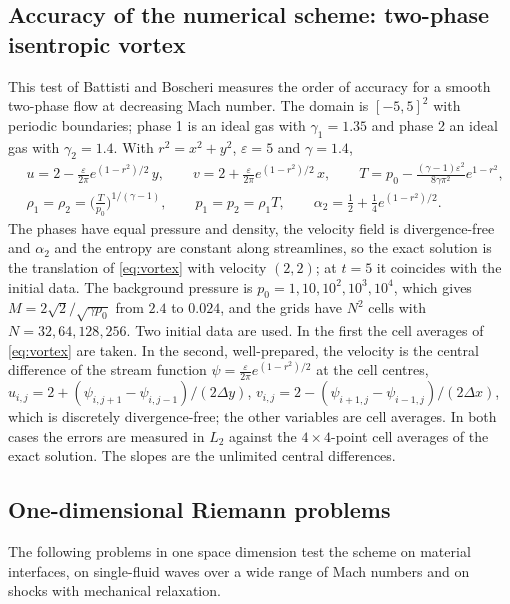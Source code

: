 \subsection{Accuracy of the numerical scheme: two-phase isentropic vortex}
\label{sec:res_vortex}
This test of Battisti and Boscheri \cite[Sec.~4.1]{BattistiBoscheri2025} measures the order of accuracy for a smooth two-phase flow at decreasing
Mach number. The domain is $[-5,5]^2$ with periodic boundaries; phase 1 is an ideal gas with $\gamma_1=1.35$ and
phase 2 an ideal gas with $\gamma_2=1.4$. With $r^2=x^2+y^2$, $\varepsilon=5$ and $\gamma=1.4$,
\begin{equation}
\begin{aligned}
&u=2-\frac{\varepsilon}{2\pi}e^{(1-r^2)/2}\,y,\qquad v=2+\frac{\varepsilon}{2\pi}e^{(1-r^2)/2}\,x,\qquad
T=p_0-\frac{(\gamma-1)\varepsilon^2}{8\gamma\pi^2}e^{1-r^2},\\
&\rho_1=\rho_2=\Big(\frac{T}{p_0}\Big)^{1/(\gamma-1)},\qquad p_1=p_2=\rho_1T,\qquad \alpha_2=\frac12+\frac14e^{(1-r^2)/2}.
\end{aligned}
\label{eq:vortex}
\end{equation}
The phases have equal pressure and density, the velocity field is divergence-free and $\alpha_2$ and the entropy are
constant along streamlines, so the exact solution is the translation of \eqref{eq:vortex} with velocity $(2,2)$; at
$t=5$ it coincides with the initial data. The background pressure is $p_0=1,10,10^2,10^3,10^4$, which gives
$M=2\sqrt2/\sqrt{\gamma p_0}$ from $2.4$ to $0.024$, and the grids have $N^2$ cells with $N=32,64,128,256$. Two initial
data are used. In the first the cell averages of \eqref{eq:vortex} are taken. In the second, well-prepared, the
velocity is the central difference of the stream function $\psi=\frac{\varepsilon}{2\pi}e^{(1-r^2)/2}$ at the cell
centres, $u_{i,j}=2+(\psi_{i,j+1}-\psi_{i,j-1})/(2\Delta y)$, $v_{i,j}=2-(\psi_{i+1,j}-\psi_{i-1,j})/(2\Delta x)$, which is discretely
divergence-free; the other variables are cell
averages. In both cases the errors are measured in $L_2$ against the $4\times4$-point cell averages of the exact solution. The slopes are the unlimited central differences.

\subsection{One-dimensional Riemann problems}
\label{sec:res_1d}
The following problems in one space dimension test the scheme on material interfaces, on single-fluid waves over a wide
range of Mach numbers and on shocks with mechanical relaxation.

